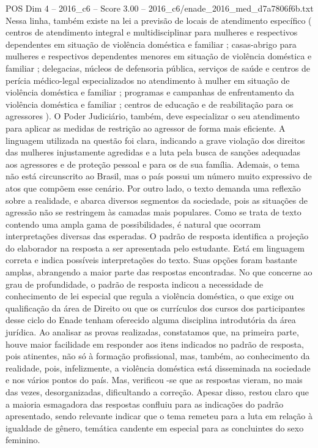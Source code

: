 \begin{textsample}{POS Dim 4 – 2016\_c6 – Score 3.00 – 2016\_c6/enade\_2016\_med\_d7a7806f6b.txt}
Nessa linha, também existe na lei a previsão de locais de atendimento específico ( centros de atendimento integral e multidisciplinar para mulheres e respectivos dependentes em situação de violência doméstica e familiar ; casas-abrigo para mulheres e respectivos dependentes menores em situação de violência doméstica e familiar ; delegacias, núcleos de defensoria pública, serviços de saúde e centros de perícia médico-legal especializados no atendimento à mulher em situação de violência doméstica e familiar ; programas e campanhas de enfrentamento da violência doméstica e familiar ; centros de educação e de reabilitação para os agressores ).
O Poder Judiciário, também, deve especializar o seu atendimento para aplicar as medidas de restrição ao agressor de forma mais eficiente.
A linguagem utilizada na questão foi clara, indicando a grave violação dos direitos das mulheres injustamente agredidas e a luta pela busca de sanções adequadas aos agressores e de proteção pessoal e para os de sua família.
Ademais, o tema não está circunscrito ao Brasil, mas o país possui um número muito expressivo de atos que compõem esse cenário.
Por outro lado, o texto demanda uma reflexão sobre a realidade, e abarca diversos segmentos da sociedade, pois as situações de agressão não se restringem às camadas mais populares.
Como se trata de texto contendo uma ampla gama de possibilidades, é natural que ocorram interpretações diversas das esperadas.
O padrão de resposta identifica a projeção do elaborador na resposta a ser apresentada pelo estudante.
Está em linguagem correta e indica possíveis interpretações do texto.
Suas opções foram bastante amplas, abrangendo a maior parte das respostas encontradas.
No que concerne ao grau de profundidade, o padrão de resposta indicou a necessidade de conhecimento de lei especial que regula a violência doméstica, o que exige ou qualificação da área de Direito ou que os currículos dos cursos dos participantes desse ciclo do Enade tenham oferecido alguma disciplina introdutória da área jurídica.
Ao analisar as provas realizadas, constatamos que, na primeira parte, houve maior facilidade em responder aos itens indicados no padrão de resposta, pois atinentes, não só à formação profissional, mas, também, ao conhecimento da realidade, pois, infelizmente, a violência doméstica está disseminada na sociedade e nos vários pontos do país.
Mas, verificou -se que as respostas vieram, no mais das vezes, desorganizadas, dificultando a correção.
Apesar disso, restou claro que a maioria esmagadora das respostas confluiu para as indicações do padrão apresentado, sendo relevante indicar que o tema remeteu para a luta em relação à igualdade de gênero, temática candente em especial para as concluintes do sexo feminino.

\end{textsample}
